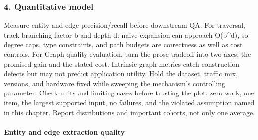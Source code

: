 \subsubsection*{4. Quantitative model}
Measure entity and edge precision/recall before downstream QA. For traversal, track branching factor b and depth d: naive expansion can approach O(b\textasciicircum{}d), so degree caps, type constraints, and path budgets are correctness as well as cost controls.
For Graph quality evaluation, turn the prose tradeoff into two axes: the promised gain and the stated cost. Intrinsic graph metrics catch construction defects but may not predict application utility. Hold the dataset, traffic mix, versions, and hardware fixed while sweeping the mechanism's controlling parameter.
Check units and limiting cases before trusting the plot: zero work, one item, the largest supported input, no failures, and the violated assumption named in this chapter. Report distributions and important cohorts, not only one average.
\paragraph{Entity and edge extraction quality}
